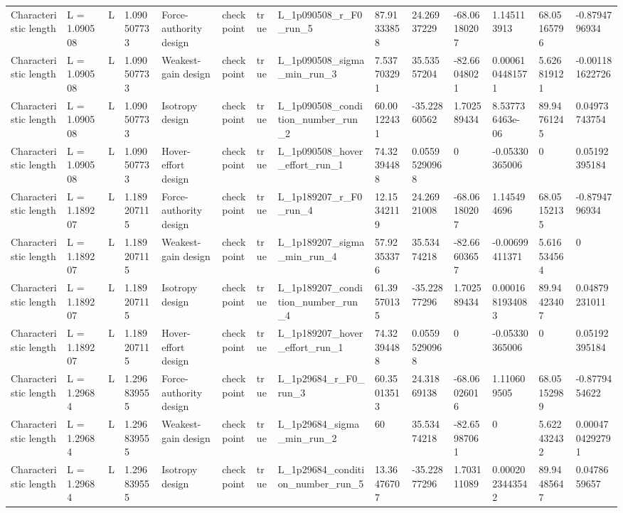 \begin{tabular}{@{}llllllllllllll@{}}
Characteristic length & L = 1.090508 & L & 1.090507733 & Force-authority design & checkpoint & true & L\_1p090508\_r\_F0\_run\_5 & 87.91333858 & 24.26937229 & -68.06180207 & 1.145113913 & 68.05165796 & -0.8794796934 \\
Characteristic length & L = 1.090508 & L & 1.090507733 & Weakest-gain design & checkpoint & true & L\_1p090508\_sigma\_min\_run\_3 & 7.537703291 & 35.53557204 & -82.66048021 & 0.0006104481571 & 5.626819121 & -0.001181622726 \\
Characteristic length & L = 1.090508 & L & 1.090507733 & Isotropy design & checkpoint & true & L\_1p090508\_condition\_number\_run\_2 & 60.00122431 & -35.22860562 & 1.702589434 & 8.537736463e-06 & 89.94761245 & 0.04973743754 \\
Characteristic length & L = 1.090508 & L & 1.090507733 & Hover-effort design & checkpoint & true & L\_1p090508\_hover\_effort\_run\_1 & 74.32394488 & 0.05595290968 & 0 & -0.05330365006 & 0 & 0.05192395184 \\
Characteristic length & L = 1.189207 & L & 1.189207115 & Force-authority design & checkpoint & true & L\_1p189207\_r\_F0\_run\_4 & 12.15342119 & 24.26921008 & -68.06180207 & 1.145494696 & 68.05152135 & -0.8794796934 \\
Characteristic length & L = 1.189207 & L & 1.189207115 & Weakest-gain design & checkpoint & true & L\_1p189207\_sigma\_min\_run\_4 & 57.92353376 & 35.53474218 & -82.66603657 & -0.00699411371 & 5.616534564 & 0 \\
Characteristic length & L = 1.189207 & L & 1.189207115 & Isotropy design & checkpoint & true & L\_1p189207\_condition\_number\_run\_4 & 61.39570135 & -35.22877296 & 1.702589434 & 0.0001681934083 & 89.94423407 & 0.04879231011 \\
Characteristic length & L = 1.189207 & L & 1.189207115 & Hover-effort design & checkpoint & true & L\_1p189207\_hover\_effort\_run\_1 & 74.32394488 & 0.05595290968 & 0 & -0.05330365006 & 0 & 0.05192395184 \\
Characteristic length & L = 1.29684 & L & 1.296839555 & Force-authority design & checkpoint & true & L\_1p29684\_r\_F0\_run\_3 & 60.35013513 & 24.31869138 & -68.06026016 & 1.110609505 & 68.05152989 & -0.8779454622 \\
Characteristic length & L = 1.29684 & L & 1.296839555 & Weakest-gain design & checkpoint & true & L\_1p29684\_sigma\_min\_run\_2 & 60 & 35.53474218 & -82.65987061 & 0 & 5.622432432 & 0.0004704292791 \\
Characteristic length & L = 1.29684 & L & 1.296839555 & Isotropy design & checkpoint & true & L\_1p29684\_condition\_number\_run\_5 & 13.36476707 & -35.22877296 & 1.703111089 & 0.0002023443542 & 89.94485647 & 0.0478659657 \\

\end{tabular}
